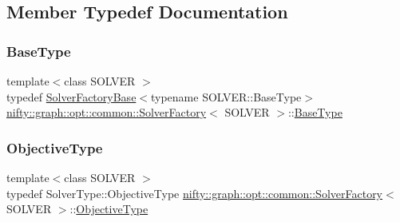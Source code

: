 \subsection{Member Typedef Documentation}
\mbox{\label{classnifty_1_1graph_1_1opt_1_1common_1_1SolverFactory_a1ee462d5a3bfe33e029bbe19e92c7684}} 
\subsubsection{\texorpdfstring{Base\+Type}{BaseType}}
{\footnotesize\ttfamily template$<$class S\+O\+L\+V\+ER $>$ \\
typedef \hyperlink{classnifty_1_1graph_1_1opt_1_1common_1_1SolverFactoryBase}{Solver\+Factory\+Base}$<$typename S\+O\+L\+V\+E\+R\+::\+Base\+Type$>$ \hyperlink{classnifty_1_1graph_1_1opt_1_1common_1_1SolverFactory}{nifty\+::graph\+::opt\+::common\+::\+Solver\+Factory}$<$ S\+O\+L\+V\+ER $>$\+::\hyperlink{classnifty_1_1graph_1_1opt_1_1common_1_1SolverFactory_a1ee462d5a3bfe33e029bbe19e92c7684}{Base\+Type}}

\mbox{\label{classnifty_1_1graph_1_1opt_1_1common_1_1SolverFactory_a4ef9d5764ef3966d6610408b90446dbc}} 
\subsubsection{\texorpdfstring{Objective\+Type}{ObjectiveType}}
{\footnotesize\ttfamily template$<$class S\+O\+L\+V\+ER $>$ \\
typedef Solver\+Type\+::\+Objective\+Type \hyperlink{classnifty_1_1graph_1_1opt_1_1common_1_1SolverFactory}{nifty\+::graph\+::opt\+::common\+::\+Solver\+Factory}$<$ S\+O\+L\+V\+ER $>$\+::\hyperlink{classnifty_1_1graph_1_1opt_1_1common_1_1SolverFactory_a4ef9d5764ef3966d6610408b90446dbc}{Objective\+Type}}


